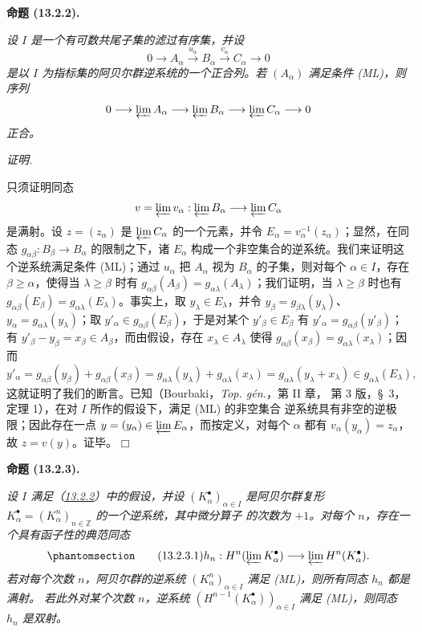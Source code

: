 \documentclass[UTF8,fontset=none,11pt,oneside,openany]{ctexbook}
\providecommand{\square}{\mdlgwhtsquare}
\newenvironment{proposition}[1][]{%
  \par\medskip\noindent\textbf{命题 (#1).}\ %
}{\par}
\newenvironment{proof}{%
  \par\smallskip\noindent\textit{证明.}\ %
}{\hfill$\square$\par}
\let\EGAOriginalLabel\label
\renewcommand{\label}[1]{\phantomsection\EGAOriginalLabel{#1}}
\begin{document}
\begin{proposition}[13.2.2]
\label{0.13.2.2-fr}
\emph{设 $I$ 是一个有可数共尾子集的滤过有序集，并设}
\[
0\longrightarrow A_\alpha\xrightarrow{u_\alpha}B_\alpha
\xrightarrow{v_\alpha}C_\alpha\longrightarrow0
\]
\emph{是以 $I$ 为指标集的阿贝尔群逆系统的一个正合列。若 $(A_\alpha)$
满足条件 (ML)，则序列}
\[
0\longrightarrow\varprojlim A_\alpha
\longrightarrow\varprojlim B_\alpha
\longrightarrow\varprojlim C_\alpha\longrightarrow0
\]
\emph{正合。}
\end{proposition}

\begin{proof}
只须证明同态
\[
v=\varprojlim v_\alpha:\varprojlim B_\alpha\longrightarrow
\varprojlim C_\alpha
\]
是满射。设 $z=(z_\alpha)$ 是 $\varprojlim C_\alpha$ 的一个元素，并令
$E_\alpha=v_\alpha^{-1}(z_\alpha)$；显然，在同态
$g_{\alpha\beta}:B_\beta\to B_\alpha$ 的限制之下，诸 $E_\alpha$
构成一个非空集合的逆系统。我们来证明这个逆系统满足条件 (ML)；通过
$u_\alpha$ 把 $A_\alpha$ 视为 $B_\alpha$ 的子集，则对每个
$\alpha\in I$，存在 $\beta\geq\alpha$，使得当 $\lambda\geq\beta$ 时有
$g_{\alpha\beta}(A_\beta)=g_{\alpha\lambda}(A_\lambda)$；我们证明，当
$\lambda\geq\beta$ 时也有
$g_{\alpha\beta}(E_\beta)=g_{\alpha\lambda}(E_\lambda)$。事实上，取
$y_\lambda\in E_\lambda$，并令
$y_\beta=g_{\beta\lambda}(y_\lambda)$、
$y_\alpha=g_{\alpha\lambda}(y_\lambda)$；取
$y'_\alpha\in g_{\alpha\beta}(E_\beta)$，于是对某个
$y'_\beta\in E_\beta$ 有 $y'_\alpha=g_{\alpha\beta}(y'_\beta)$；
有 $y'_\beta-y_\beta=x_\beta\in A_\beta$，而由假设，存在
$x_\lambda\in A_\lambda$ 使得
$g_{\alpha\beta}(x_\beta)=g_{\alpha\lambda}(x_\lambda)$；因而
\[
y'_\alpha=g_{\alpha\beta}(y_\beta)+g_{\alpha\beta}(x_\beta)
=g_{\alpha\lambda}(y_\lambda)+g_{\alpha\lambda}(x_\lambda)
=g_{\alpha\lambda}(y_\lambda+x_\lambda)
\in g_{\alpha\lambda}(E_\lambda),
\]
这就证明了我们的断言。已知（Bourbaki，\emph{Top. gén.}，第 II 章，
第 3 版，§~3，定理 1），在对 $I$ 所作的假设下，满足 (ML) 的非空集合
逆系统具有非空的逆极限；因此存在一点
$y=(y_\alpha)\in\varprojlim E_\alpha$，而按定义，对每个 $\alpha$ 都有
$v_\alpha(y_\alpha)=z_\alpha$，故 $z=v(y)$。证毕。
\end{proof}

\begin{proposition}[13.2.3]
\label{0.13.2.3-fr}
\emph{设 $I$ 满足（\hyperref[0.13.2.2-fr]{13.2.2}）中的假设，并设
$(K_\alpha^\bullet)_{\alpha\in I}$ 是阿贝尔群复形
$K_\alpha^\bullet=(K_\alpha^n)_{n\in\mathbb Z}$ 的一个逆系统，其中微分算子
的次数为 $+1$。对每个 $n$，存在一个具有函子性的典范同态}
\begin{equation}
\label{0.13.2.3.1-fr}
\tag{13.2.3.1}
h_n:H^n(\varprojlim K_\alpha^\bullet)
\longrightarrow\varprojlim H^n(K_\alpha^\bullet).
\end{equation}
\emph{若对每个次数 $n$，阿贝尔群的逆系统
$(K_\alpha^n)_{\alpha\in I}$ 满足 (ML)，则所有同态 $h_n$ 都是满射。
若此外对某个次数 $n$，逆系统
$(H^{n-1}(K_\alpha^\bullet))_{\alpha\in I}$ 满足 (ML)，则同态 $h_n$
是双射。}
\end{proposition}
\end{document}
